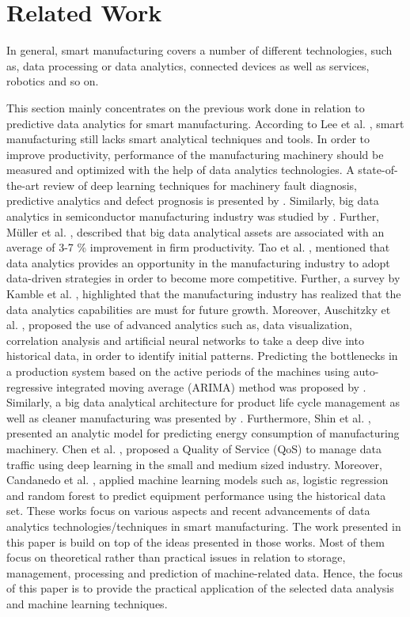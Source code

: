 \documentclass[runningheads]{llncs}
\begin{document}
\section{Related Work}
\label{sec:relatedwork}
In general, smart manufacturing covers a number of different technologies, such as, data processing or data analytics, connected devices as well as services, robotics and so on. 

This section mainly concentrates on the previous work done in relation to predictive data analytics for smart manufacturing. According to Lee et al. \cite{Lee}, smart manufacturing still lacks smart analytical techniques and tools. In order to improve productivity, performance of the manufacturing machinery should be measured and optimized with the help of data analytics technologies. A state-of-the-art review of deep learning techniques for machinery fault diagnosis, predictive analytics and defect prognosis is presented by \cite{Wang}. Similarly, big data analytics in semiconductor manufacturing industry was studied by \cite{Moyne}. Further, M\"uller et al. \cite{Muller}, described that big data analytical assets are associated with an average of 3-7 \% improvement in firm productivity. Tao et al. \cite{Tao}, mentioned that data analytics provides an opportunity in the manufacturing industry to adopt data-driven strategies in order to become more competitive. Further, a survey by Kamble et al. \cite{Kamble}, highlighted that the manufacturing industry has realized that the data analytics capabilities are must for future growth. Moreover, Auschitzky et al. \cite{Auschitzky}, proposed the use of advanced analytics such as, data visualization, correlation analysis and artificial neural networks to take a deep dive into historical data, in order to identify initial patterns. Predicting the bottlenecks in a production system based on the active periods of the machines using auto-regressive integrated moving average (ARIMA) method was proposed by \cite{Subramaniyan}. Similarly, a big data analytical architecture for product life cycle management as well as cleaner manufacturing was presented by \cite{Zhang}. Furthermore, Shin et al. \cite{Shin}, presented an analytic model for predicting energy consumption of manufacturing machinery. Chen et al. \cite{Chen}, proposed a Quality of Service (QoS) to manage data traffic using deep learning in the small and medium sized industry. Moreover, Candanedo et al. \cite{Candanedo}, applied machine learning models such as, logistic regression and random forest to predict equipment performance using the historical data set. These works focus on various aspects and recent advancements of data analytics technologies/techniques in smart manufacturing. The work presented in this paper is build on top of the ideas presented in those works. Most of them focus on theoretical rather than practical issues in relation to storage, management, processing and prediction of machine-related data. Hence, the focus of this paper is to provide the practical application of the selected data analysis and machine learning techniques.
\end{document}
